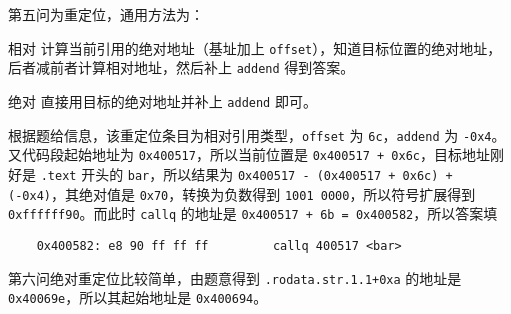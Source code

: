 \begin{problems}
        第五问为重定位，通用方法为：
        \begin{compactdesc}
            \item[相对] 计算当前引用的绝对地址（基址加上 \verb|offset|），知道目标位置的绝对地址，后者减前者计算相对地址，然后补上 \verb|addend| 得到答案。
            \item[绝对] 直接用目标的绝对地址并补上 \verb|addend| 即可。
        \end{compactdesc}
        根据题给信息，该重定位条目为相对引用类型，\verb|offset| 为 \verb|6c|，\verb|addend| 为 \verb|-0x4|。又代码段起始地址为 \verb|0x400517|，所以当前位置是 \verb|0x400517 + 0x6c|，目标地址刚好是 \verb|.text| 开头的 \verb|bar|，所以结果为 \verb|0x400517 - (0x400517 + 0x6c) + (-0x4)|，其绝对值是 \verb|0x70|，转换为负数得到 \verb|1001 0000|，所以符号扩展得到 \verb|0xffffff90|。而此时 \verb|callq| 的地址是 \verb|0x400517 + 6b = 0x400582|，所以答案填
        \begin{verbatim}
    0x400582: e8 90 ff ff ff         callq 400517 <bar>
        \end{verbatim}
        第六问绝对重定位比较简单，由题意得到 \verb|.rodata.str.1.1+0xa| 的地址是 \verb|0x40069e|，所以其起始地址是 \verb|0x400694|。


\end{problems}
